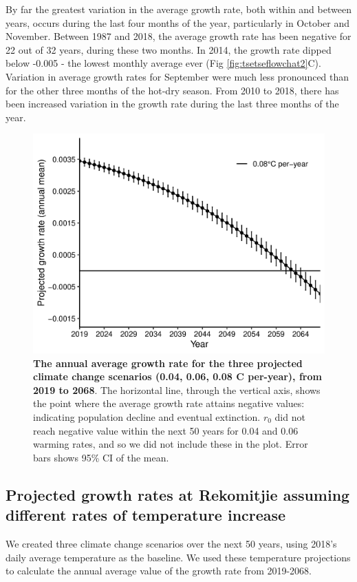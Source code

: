 \documentclass[12pt,a4paper]{article}
\begin{document}
\newpage

By far the greatest variation in the average growth rate, both within and between years, occurs during the last four months of the year, particularly in October and November. Between 1987 and 2018, the average growth rate has been negative for 22  out of 32 years, during these two months. In 2014, the growth rate dipped below -0.005 - the lowest monthly average ever (Fig \ref{fig:tsetseflowchat2}C). Variation in average growth rates for September were much less pronounced than for the other three months of the hot-dry season. From 2010 to 2018, there has been increased variation in the growth rate during the last three months of the year. 

\begin{figure}[h]
	\centering
	\includegraphics[width=0.8\linewidth]{ProjectionwithErrBar}
\caption{{\bf The annual average growth rate for the three projected climate change scenarios (0.04, 0.06, 0.08 \degree C per-year), from 2019 to 2068}. The horizontal line, through the vertical axis, shows the point where the average growth rate attains negative values: indicating population decline and eventual extinction. $r_0$ did not reach negative value within the next 50 years for 0.04 and 0.06 warming rates, and so we did not include these in the plot. Error bars shows 95\% CI of the mean.}
	\label{fig:tsetseflowchat4}
\end{figure}



\subsection*{Projected growth rates at Rekomitjie assuming different rates of temperature increase}
We created three climate change scenarios over the next 50 years, using 2018's daily average temperature as the baseline. We used these temperature projections to calculate the annual average value of the growth rate from 2019-2068.
\end{document}
